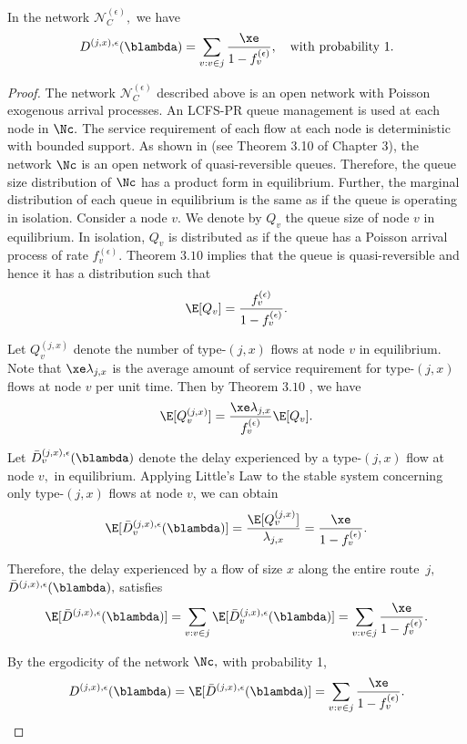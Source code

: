 \begin{thm}
\label{thm:Delay_Nc} 
In the network $\mathcal{N}_{C}^{(\epsilon)},$ we have
\[
{D}^{(j,x),\epsilon} (\blambda) =\sum_{v:v\in j}\frac{\xe}{1-f_{v}^{(\epsilon)}},\quad \mbox{with probability } 1.
\]
\end{thm}
\begin{proof}

	
The network $\mathcal{N}_{C}^{(\epsilon)}$ described above is an
open network with Poisson exogenous arrival processes. An LCFS-PR queue
management is used at each node in $\Nc.$ The service requirement
of each flow at each node is deterministic with bounded support. As
shown in \cite{kelly1979reversibility} (see Theorem 3.10 of Chapter 3), the network
$\Nc$ is an open network of quasi-reversible queues. Therefore, the
queue size distribution of $\Nc$ has a product form in equilibrium.
Further, the marginal distribution of each queue in equilibrium is
the same as if the queue is operating in isolation. Consider a node
$v.$ We denote by $Q_{v}$ the queue size of node $v$ in equilibrium.
In isolation, $Q_{v}$ is distributed as if the queue has a Poisson
arrival process of rate $f_{v}^{(\epsilon)}.$ Theorem $3.10$ implies
that the queue is quasi-reversible and hence it has a distribution such
that 
\[
\E[Q_{v}]=\frac{f_{v}^{(\epsilon)}}{1-f_{v}^{(\epsilon)}}.
\]

Let $Q_{v}^{(j,x)}$ denote the number of type-$(j,x)$ flows at node
$v$ in equilibrium. Note that $\xe\lambda_{j,x}$ is the average
amount of service requirement for type-$(j,x)$ flows at node $v$
per unit time. Then by Theorem $3.10$ \cite{kelly1979reversibility}, we have 
\[
\E[Q_{v}^{(j,x)}]=\frac{\xe\lambda_{j,x}}{f_{v}^{(\epsilon)}}\E[Q_{v}]. 
\]


Let $\bar{D}_{v}^{(j,x),\epsilon} (\blambda)$ denote the delay experienced by a type-$(j,x)$ flow at node $v,$ in equilibrium.
Applying Little's Law to the stable system concerning only type-$(j,x)$
flows at node $v$, we can obtain 
\[
\E[\bar{D}_{v}^{(j,x),\epsilon} (\blambda)]=\frac{\E[Q_{v}^{(j,x)}]}{\lambda_{j,x}}=\frac{\xe}{1-f_{v}^{(\epsilon)}}.
\]

Therefore, the delay experienced by a flow of size $x$ along the entire route~$j,$ $\bar{D}^{(j,x),\epsilon}(\blambda),$ satisfies
\[
\E[\bar{D}^{(j,x),\epsilon} (\blambda)]=\sum_{v:v\in j}\E[\bar{D}_{v}^{(j,x),\epsilon} (\blambda)]=\sum_{v:v\in j}\frac{\xe}{1-f_{v}^{(\epsilon)}}.
\]

By the ergodicity of the network $\Nc,$ with probability 1, 
\[
{D}^{(j,x),\epsilon} (\blambda) =\E[\bar{D}^{(j,x),\epsilon} (\blambda)]=\sum_{v:v\in j}\frac{\xe}{1-f_{v}^{(\epsilon)}}.
\]

\end{proof}


